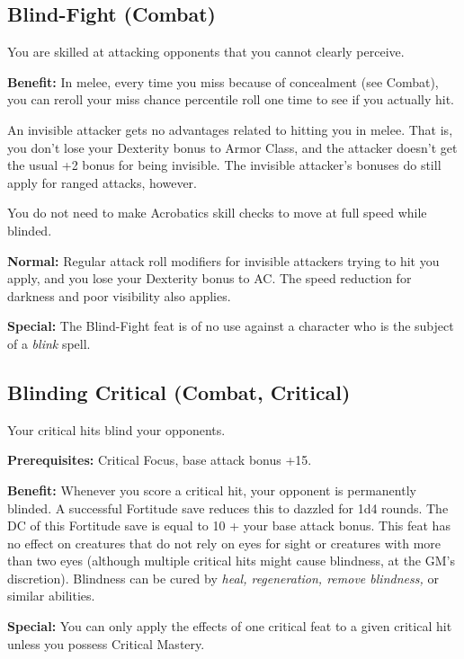 \subsection{Blind-Fight (Combat)}

				
You are skilled at attacking opponents that you cannot clearly perceive.
				
\textbf{Benefit:} In melee, every time you miss because of concealment (see Combat), you can reroll your miss chance percentile roll one time to see if you actually hit.

An invisible attacker gets no advantages related to hitting you in melee. That is, you don't lose your Dexterity bonus to Armor Class, and the attacker doesn't get the usual +2 bonus for being invisible. The invisible attacker's bonuses do still apply for ranged attacks, however.

You do not need to make Acrobatics skill checks to move at full speed while blinded.
				
\textbf{Normal:} Regular attack roll modifiers for invisible attackers trying to hit you apply, and you lose your Dexterity bonus to AC. The speed reduction for darkness and poor visibility also applies.
				
\textbf{Special:} The Blind-Fight feat is of no use against a character who is the subject of a \textit{blink }spell.
				
\subsection{Blinding Critical (Combat, Critical)}

				
Your critical hits blind your opponents.
				
\textbf{Prerequisites:} Critical Focus, base attack bonus +15.
				
\textbf{Benefit:} Whenever you score a critical hit, your opponent is permanently blinded. A successful Fortitude save reduces this to dazzled for 1d4 rounds. The DC of this Fortitude save is equal to 10 + your base attack bonus. This feat has no effect on creatures that do not rely on eyes for sight or creatures with more than two eyes (although multiple critical hits might cause blindness, at the GM's discretion). Blindness can be cured by \textit{heal, regeneration, remove blindness, }or similar abilities.
				
\textbf{Special:} You can only apply the effects of one critical feat to a given critical hit unless you possess Critical Mastery.
				
